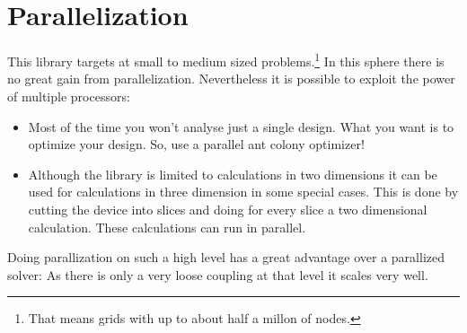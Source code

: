 \section{Parallelization}
\label{sec:parallelization}

This library targets at small to medium sized problems.\footnote{That
  means grids with up to about half a millon of nodes.} In this sphere
there is no great gain from parallelization.  Nevertheless it is
possible to exploit the power of multiple processors:
\begin{itemize}
\item Most of the time you won't analyse just a single design. What
  you want is to optimize your design.  So, use a parallel ant colony
  optimizer!
\item Although the library is limited to calculations in two
  dimensions it can be used for calculations in three dimension in
  some special cases.  This is done by cutting the device into slices
  and doing for every slice a two dimensional calculation.  These
  calculations can run in parallel.
\end{itemize}
Doing parallization on such a high level has a great advantage over a
parallized solver:  As there is only a very loose coupling at that
level it scales very well.


